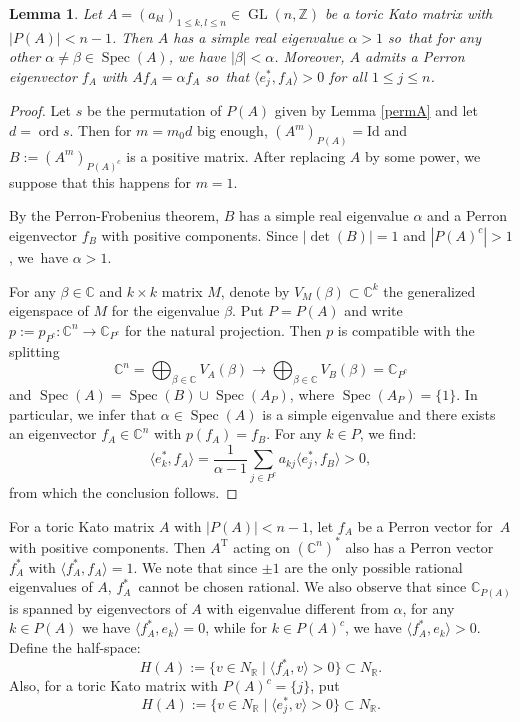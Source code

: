 \documentclass[JEP,XML,SOM,Unicode,NoFloatCountersInSection]{cedram}
\newtheorem{lemma}[theorem]{Lemma}
\theoremstyle{definition}
\let\al\alpha
\let\be\beta
\newcommand{\CC}{\mathbb{C}}
\newcommand{\RR}{\mathbb{R}}
\newcommand{\ZZ}{\mathbb{Z}}
\DeclareMathOperator{\GL}{GL}
\DeclareMathOperator{\ord}{ord}
\DeclareMathOperator{\Spec}{Spec}
\newcommand{\transp}[1]{{#1}^{\scriptscriptstyle\mathrm{T}}}
\begin{document}
\begin{lemma}\label{PerronNP}
Let $A=(a_{kl})_{1\leq k,l\leq n}\in\GL(n,\ZZ)$ be a toric Kato matrix with $|P(A)|<n-1$. Then $A$ has a simple real eigenvalue $\al>1$ so~that for any other $\al\neq\be\in\Spec(A)$, we have $|\be|<\al$. Moreover, $A$ admits a Perron eigenvector $f_A$ with $Af_A=\al f_A$ so~that $\langle e_j^*, f_A\rangle>0$ for all $1\leq j\leq n$.
\end{lemma}
\begin{proof}
Let $s$ be the permutation of $P(A)$ given by Lemma \ref{permA} and let $d=\ord s$. Then for $m=m_0d$ big enough, $(A^m)_{P(A)}=\mathrm{Id}$ and $B:=(A^m)_{P(A)^c}$ is a positive matrix. After replacing $A$ by some power, we suppose that this happens for $m=1$.

By the Perron-Frobenius theorem, $B$ has a simple real eigenvalue $\al$ and a Perron eigenvector $f_B$ with positive components. Since $|{\det(B)}|=1$ and $|P(A)^c|>1$, we~have $\al>1$.

For any $\be\in\CC$ and $k\times k$ matrix $M$, denote by $V_M(\be)\subset \CC^k$ the generalized eigenspace of $M$ for the eigenvalue $\be$. Put $P=P(A)$ and write $p:=p_{P^c}:
\CC^n\to \CC_{P^c}$ for the natural projection. Then $p$ is compatible with the splitting
\begin{equation*}
\CC^n=\bigoplus_{\be\in\CC}V_A(\be)\to \bigoplus_{\be\in\CC}V_B(\be)=\CC_{P^c}
\end{equation*}
and $\Spec(A)=\Spec(B)\cup\Spec(A_{P})$, where $\Spec(A_{P})=\{1\}$. In particular, we infer that $\al\in\Spec(A)$ is a simple eigenvalue and there exists an eigenvector $f_A\in\CC^n$ with $p(f_A)=f_B$. For any $k\in P$, we find:
\begin{equation*}
\langle e_k^*,f_A\rangle=\frac{1}{\al-1}\sum_{j\in P^c}a_{kj}\langle e_j^*, f_B\rangle>0,
\end{equation*}
from which the conclusion follows.
\end{proof}

For a toric Kato matrix $A$ with $|P(A)|<n-1$, let $f_A$ be a Perron vector for~$A$ with positive components. Then $\transp{A}$ acting on $(\CC^n)^*$ also has a Perron vector $f_A^*$ with $\langle f_A^*, f_A\rangle=1$. We note that since $\pm 1$ are the only possible rational eigenvalues of $A$, $f^*_A$~cannot be chosen rational. We also observe that since $\CC_{P(A)}$ is spanned by eigenvectors of $A$ with eigenvalue different from $\al$, for any $k\in P(A)$ we have $\langle f_A^*,e_k\rangle=0$, while for $k\in P(A)^c$, we have $\langle f_A^*, e_k\rangle >0$.
Define the half-space:
\begin{equation*}
H(A):=\{v\in N_\RR\mid \langle f_A^*,v\rangle>0\}\subset N_\RR.
\end{equation*}
Also, for a toric Kato matrix with $P(A)^c=\{j\}$, put
\begin{equation*}
H(A):=\{v\in N_\RR\mid\langle e_j^*,v\rangle >0\}\subset N_\RR.
\end{equation*}
\end{document}
